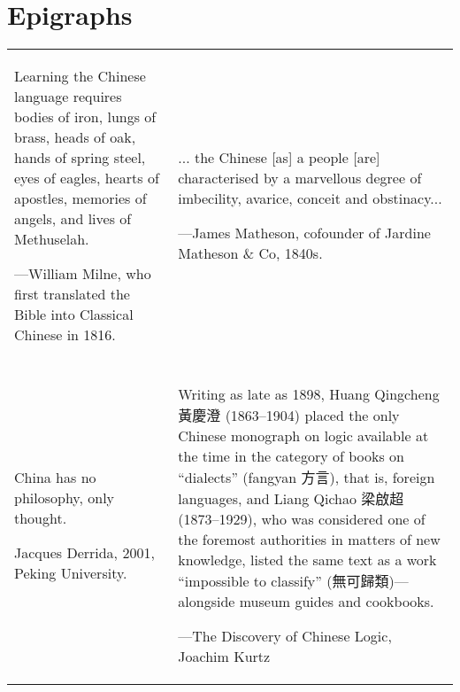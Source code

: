 \section{Epigraphs}

\begin{table}[h]
\centering
\begin{tabular}{p{}p{}}
\epigraph{Learning the Chinese language requires bodies of iron, lungs of brass, heads of oak, hands of spring steel, eyes of eagles, hearts of apostles, memories of angels, and lives of Methuselah.}{---William Milne, who first translated the Bible into Classical Chinese in 1816.} &
\epigraph{... the Chinese [as] a people [are] characterised by a marvellous degree of imbecility, avarice, conceit and obstinacy...}{---James Matheson, cofounder of Jardine Matheson \& Co, 1840s.} \\
\vspace{1em} & \vspace{1em} \\
\epigraph{China has no philosophy, only thought.}{Jacques Derrida, 2001, Peking University.} &
\epigraph{Writing as late as 1898, Huang Qingcheng 黃慶澄 (1863--1904) placed the only Chinese monograph on logic available at the time in the category of books on ``dialects'' (fangyan 方言), that is, foreign languages, and Liang Qichao 梁啟超 (1873--1929), who was considered one of the foremost authorities in matters of new knowledge, listed the same text as a work ``impossible to classify'' (無可歸類)---alongside museum guides and cookbooks.}{---The Discovery of Chinese Logic, Joachim Kurtz}\\


\end{tabular}
\end{table}


